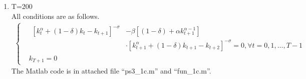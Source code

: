 \documentclass{article}
\begin{document}
\begin{enumerate}
\begin{enumerate}
\begin{enumerate}
\begin{equation*}
\begin{aligned}
                    &k_2=0.0915\\
                    &k_3=0
                    \end{aligned}
                \right.
            \end{equation*}
            \item Comparasion between Cass-Koopmans model and Solow model with respect to saving rate
            \begin{equation*}
                \left\{
                    \begin{aligned}
                    &s_0=0.1724\\
                    &s_1=0.1077\\
                    &s_2=-0.1688
                    \end{aligned}
                \right.
            \end{equation*}
            In Cass-Koopmans Model, the savings rate is endogenous and varies from time to time. The savings rate at the period before the last period must be negative.
            As for Solow Model, the steady-state savings rate is exogenous, while the savings rate given by the Golden Rule is endogenous. 
        \end{enumerate}
        \item T=200\\
        All conditions are as follows.
        \begin{gather*}
            \left\{\begin{aligned}
                &\begin{split}
                    [k_t^\alpha+(1-\delta)k_t-k_{t+1}]^{-\sigma}&-\beta[(1-\delta)+\alpha k_{t+1}^{\alpha-1}]\\
                    &\cdot[k_{t+1}^\alpha+(1-\delta)k_{t+1}-k_{t+2}]^{-\sigma}=0,\forall t=0,1,\dots,T-1
                \end{split}\\
                &k_{T+1}=0
                \end{aligned}\right.
        \end{gather*}
        The Matlab code is in attached file ``ps3\_1c.m'' and ``fun\_1c.m''.
        \begin{figure}[h!]

\end{figure}
\end{enumerate}
\end{enumerate}
\end{document}
